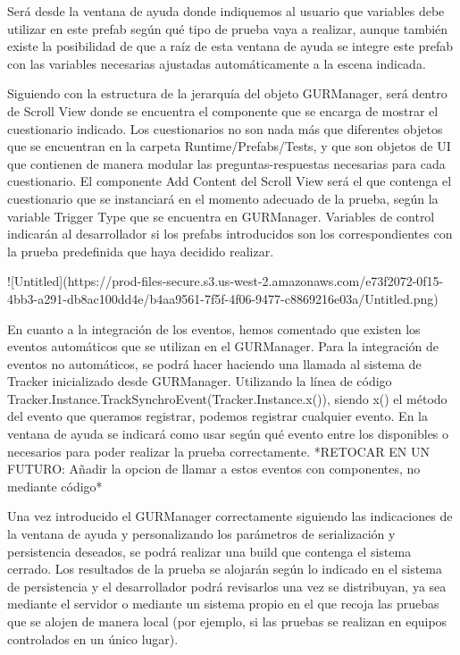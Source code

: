 Será desde la ventana de ayuda donde indiquemos al usuario que variables debe utilizar en este prefab según qué tipo de prueba vaya a realizar, aunque también existe la posibilidad de que a raíz de esta ventana de ayuda se integre este prefab con las variables necesarias ajustadas automáticamente a la escena indicada.

Siguiendo con la estructura de la jerarquía del objeto GURManager, será dentro de Scroll View donde se encuentra el componente que se encarga de mostrar el cuestionario indicado. Los cuestionarios no son nada más que diferentes objetos que se encuentran en la carpeta Runtime/Prefabs/Tests, y que son objetos de UI que contienen de manera modular las preguntas-respuestas necesarias para cada cuestionario. El componente Add Content del Scroll View será el que contenga el cuestionario que se instanciará en el momento adecuado de la prueba, según la variable Trigger Type que se encuentra en GURManager. Variables de control indicarán al desarrollador si los prefabs introducidos son los correspondientes con la prueba predefinida que haya decidido realizar.

![Untitled](https://prod-files-secure.s3.us-west-2.amazonaws.com/e73f2072-0f15-4bb3-a291-db8ac100dd4e/b4aa9561-7f5f-4f06-9477-c8869216e03a/Untitled.png)

En cuanto a la integración de los eventos, hemos comentado que existen los eventos automáticos que se utilizan en el GURManager. Para la integración de eventos no automáticos, se podrá hacer haciendo una llamada al sistema de Tracker inicializado desde GURManager. Utilizando la línea de código Tracker.Instance.TrackSynchroEvent(Tracker.Instance.x()), siendo x() el método del evento que queramos registrar, podemos registrar cualquier evento. En la ventana de ayuda se indicará como usar según qué evento entre los disponibles o necesarios para poder realizar la prueba correctamente. *RETOCAR EN UN FUTURO: Añadir la opcion de llamar a estos eventos con componentes, no mediante código*

Una vez introducido el GURManager correctamente siguiendo las indicaciones de la ventana de ayuda y personalizando los parámetros de serialización y persistencia deseados, se podrá realizar una build que contenga el sistema cerrado. Los resultados de la prueba se alojarán según lo indicado en el sistema de persistencia y el desarrollador podrá revisarlos una vez se distribuyan, ya sea mediante el servidor o mediante un sistema propio en el que recoja las pruebas que se alojen de manera local (por ejemplo, si las pruebas se realizan en equipos controlados en un único lugar).

